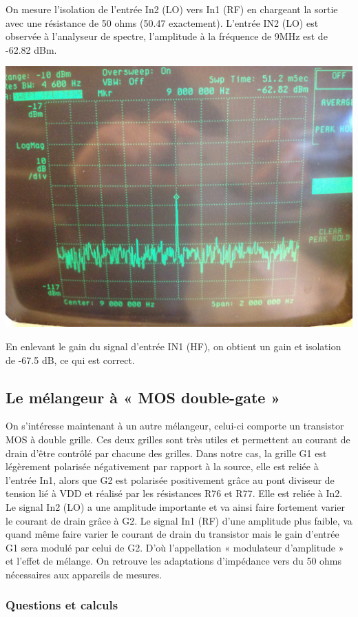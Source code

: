 \documentclass{article}
\begin{document}
On mesure l'isolation de l'entrée In2 (LO) vers In1 (RF) en chargeant la sortie avec une résistance de 50 ohms (50.47 exactement).
L'entrée IN2 (LO) est observée à l'analyseur de spectre, l'amplitude à la fréquence de 9MHz est de -62.82 dBm.
\begin{center}
\includegraphics[width=0.7\linewidth]{9_3_5.jpg}
\end{center}
En enlevant le gain du signal d'entrée IN1 (HF), on obtient un gain et isolation de -67.5 dB, ce qui est correct.


\subsection{Le mélangeur à « MOS double-gate »}

On s'intéresse maintenant à un autre mélangeur, celui-ci comporte un transistor MOS à double grille. Ces deux grilles sont très utiles et permettent au courant de drain d'être contrôlé par chacune des grilles. Dans notre cas, la grille G1 est légèrement polarisée négativement par rapport à la source, elle est reliée à l'entrée In1, alors que G2 est polarisée positivement grâce au pont diviseur de tension lié à VDD et réalisé par les résistances R76 et R77. Elle est reliée à In2.
Le signal In2 (LO) a une amplitude importante et va ainsi faire fortement varier le courant de drain grâce à G2. Le signal In1 (RF) d'une amplitude plus faible, va quand même faire varier le courant de drain du transistor mais le gain d'entrée G1 sera modulé par celui de G2. D'où l'appellation « modulateur d'amplitude » et l'effet de mélange.
On retrouve les adaptations d'impédance vers du 50 ohms nécessaires aux appareils de mesures.



\subsubsection{Questions et calculs}
\end{document}
